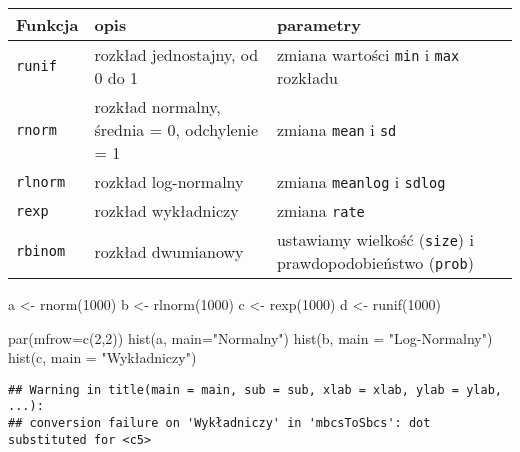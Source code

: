\documentclass[
]{book}
\newenvironment{Shaded}{\begin{snugshade}}{\end{snugshade}}
\newcommand{\AttributeTok}[1]{\textcolor[rgb]{0.77,0.63,0.00}{#1}}
\newcommand{\DecValTok}[1]{\textcolor[rgb]{0.00,0.00,0.81}{#1}}
\newcommand{\FunctionTok}[1]{\textcolor[rgb]{0.00,0.00,0.00}{#1}}
\newcommand{\NormalTok}[1]{#1}
\newcommand{\OtherTok}[1]{\textcolor[rgb]{0.56,0.35,0.01}{#1}}
\newcommand{\StringTok}[1]{\textcolor[rgb]{0.31,0.60,0.02}{#1}}
\begin{document}
\begin{longtable}[]{@{}
  >{\raggedright\arraybackslash}p{}
  >{\raggedright\arraybackslash}p{}
  >{\raggedright\arraybackslash}p{}@{}}
\toprule
Funkcja & opis & parametry \\
\midrule
\endhead
\texttt{runif} & rozkład jednostajny, od 0 do 1 & zmiana wartości \texttt{min} i \texttt{max} rozkładu \\
\texttt{rnorm} & rozkład normalny, średnia = 0, odchylenie = 1 & zmiana \texttt{mean} i \texttt{sd} \\
\texttt{rlnorm} & rozkład log-normalny & zmiana \texttt{meanlog} i \texttt{sdlog} \\
\texttt{rexp} & rozkład wykładniczy & zmiana \texttt{rate} \\
\texttt{rbinom} & rozkład dwumianowy & ustawiamy wielkość (\texttt{size}) i prawdopodobieństwo (\texttt{prob}) \\
\bottomrule
\end{longtable}

\begin{Shaded}
\begin{Highlighting}[]
\NormalTok{a }\OtherTok{\textless{}{-}} \FunctionTok{rnorm}\NormalTok{(}\DecValTok{1000}\NormalTok{)}
\NormalTok{b }\OtherTok{\textless{}{-}} \FunctionTok{rlnorm}\NormalTok{(}\DecValTok{1000}\NormalTok{)}
\NormalTok{c }\OtherTok{\textless{}{-}} \FunctionTok{rexp}\NormalTok{(}\DecValTok{1000}\NormalTok{)}
\NormalTok{d }\OtherTok{\textless{}{-}} \FunctionTok{runif}\NormalTok{(}\DecValTok{1000}\NormalTok{)}

\FunctionTok{par}\NormalTok{(}\AttributeTok{mfrow=}\FunctionTok{c}\NormalTok{(}\DecValTok{2}\NormalTok{,}\DecValTok{2}\NormalTok{))}
\FunctionTok{hist}\NormalTok{(a, }\AttributeTok{main=}\StringTok{"Normalny"}\NormalTok{)}
\FunctionTok{hist}\NormalTok{(b, }\AttributeTok{main =} \StringTok{"Log{-}Normalny"}\NormalTok{)}
\FunctionTok{hist}\NormalTok{(c, }\AttributeTok{main =} \StringTok{"Wykładniczy"}\NormalTok{)}
\end{Highlighting}
\end{Shaded}

\begin{verbatim}
## Warning in title(main = main, sub = sub, xlab = xlab, ylab = ylab, ...):
## conversion failure on 'Wykładniczy' in 'mbcsToSbcs': dot substituted for <c5>
\end{verbatim}
\end{document}
